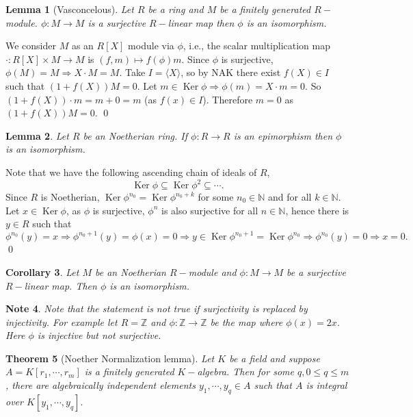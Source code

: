 \documentclass[11pt]{amsart}
\newtheorem{theorem}{Theorem}[section]
\newtheorem{note}[theorem]{Note}
\newtheorem{corollary}[theorem]{Corollary}%
\newtheorem{lemma}[theorem]{Lemma}%
\newcommand{\ZZ}{\mathbb Z}
\newcommand{\NN}{\mathbb N}
\newcommand{\gen}[1]{\langle#1\rangle}
\DeclareMathOperator{\Ker}{\text{Ker}}
\begin{document}
\begin{lemma}[Vasconcelous]

Let $R$ be a ring and $M$ be a finitely generated $R-$module. $\phi:M\to M$ is a surjective $R-$linear map then $\phi$ is an isomorphism.

\end{lemma}

\proof We consider $M$ as an $R[X]$ module via $\phi$, i.e., the scalar multiplication map $\cdot:R[X]\times M\to M$ is $(f,m)\mapsto f(\phi)m.$ Since $\phi$ is surjective, $\phi(M)=M \Rightarrow X\cdot M=M.$ Take $I=\gen{X}$, so by NAK there exist $f(X)\in I$ such that $(1+f(X))M=0.$ Let $m\in\Ker\phi \Rightarrow \phi(m)=X\cdot m=0.$ So $(1+f(X))\cdot m=m+0=m$ (as $f(x)\in I$). Therefore $m=0$ as $(1+f(X))M=0$. \qed

\begin{lemma}

Let $R$ be an Noetherian ring. If $\phi: R\to R$ is an epimorphism then $\phi$ is an isomorphism.

\end{lemma}

\proof Note that we have the following ascending chain of ideals of $R$, $$\Ker\phi\subseteq \Ker\phi^2\subseteq\cdots .$$ Since $R$ is Noetherian, $\Ker\phi^{n_0}=\Ker\phi^{n_0+k}$ for some $n_0\in{\NN}$ and for all $k\in{\NN}$. Let $x\in\Ker\phi$, as $\phi$ is surjective, $\phi^n$ is also surjective for all $n\in{\NN}$, hence there is $y\in R$ such that $\phi^{n_0}(y)=x \Rightarrow \phi^{n_0+1}(y)=\phi(x)=0 \Rightarrow y\in\Ker\phi^{n_0+1}=\Ker\phi^{n_0} \Rightarrow \phi^{n_0}(y)=0 \Rightarrow x=0.$ \qed

\begin{corollary}

Let $M$ be an Noetherian $R-$module and $\phi:M\to M$ be a surjective $R-$linear map. Then $\phi$ is an isomorphism.

\end{corollary}

\begin{note}

Note that the statement is not true if surjectivity is replaced by injectivity. For example let $R={\ZZ}$ and $\phi:{\ZZ}\to {\ZZ}$ be the map where $\phi(x)=2x$. Here $\phi$ is injective but not surjective.

\end{note}

\begin{theorem}[Noether Normalization lemma]

Let $K$ be a field and suppose $A=K[r_1,\cdots,r_m]$ is a finitely generated $K-$algebra. Then for some $q,0\leq q\leq m$, there are algebraically independent elements $y_1,\cdots,y_q\in A$ such that $A$ is integral over $K[y_1,\cdots, y_q].$

\end{theorem}
\end{document}
